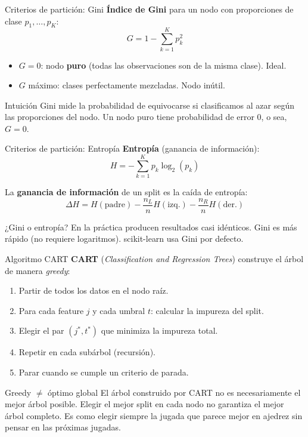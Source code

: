 \documentclass[aspectratio=169]{beamer}
\begin{document}
\begin{frame}{Criterios de partición: Gini}
  \textbf{Índice de Gini} para un nodo con proporciones de clase $p_1, \ldots, p_K$:
  \[
    G = 1 - \sum_{k=1}^{K} p_k^2
  \]

  \begin{itemize}
    \item $G = 0$: nodo \textbf{puro} (todas las observaciones son de la misma clase). Ideal.
    \item $G$ máximo: clases perfectamente mezcladas. Nodo inútil.
  \end{itemize}

  \medskip
  \begin{exampleblock}{Intuición}
    Gini mide la probabilidad de equivocarse si clasificamos al azar según las proporciones del nodo.
    Un nodo puro tiene probabilidad de error 0, o sea, $G = 0$.
  \end{exampleblock}
\end{frame}

\begin{frame}{Criterios de partición: Entropía}
  \textbf{Entropía} (ganancia de información):
  \[
    H = -\sum_{k=1}^{K} p_k \log_2(p_k)
  \]

  La \textbf{ganancia de información} de un split es la caída de entropía:
  \[
    \Delta H = H(\text{padre}) - \frac{n_L}{n} H(\text{izq.}) - \frac{n_R}{n} H(\text{der.})
  \]

  \medskip
  \begin{block}{¿Gini o entropía?}
    En la práctica producen resultados casi idénticos.
    Gini es más rápido (no requiere logaritmos).
    scikit-learn usa Gini por defecto.
  \end{block}
\end{frame}

\begin{frame}{Algoritmo CART}
  \textbf{CART} (\textit{Classification and Regression Trees}) construye el árbol de manera \textit{greedy}:

  \medskip
  \begin{enumerate}
    \item Partir de todos los datos en el nodo raíz.
    \item Para cada feature $j$ y cada umbral $t$: calcular la impureza del split.
    \item Elegir el par $(j^*, t^*)$ que minimiza la impureza total.
    \item Repetir en cada subárbol (recursión).
    \item Parar cuando se cumple un criterio de parada.
  \end{enumerate}

  \medskip
  \begin{alertblock}{Greedy $\neq$ óptimo global}
    El árbol construido por CART no es necesariamente el mejor árbol posible.
    Elegir el mejor split en cada nodo no garantiza el mejor árbol completo.
    Es como elegir siempre la jugada que parece mejor en ajedrez
    sin pensar en las próximas jugadas.
  \end{alertblock}
\end{frame}
\end{document}

